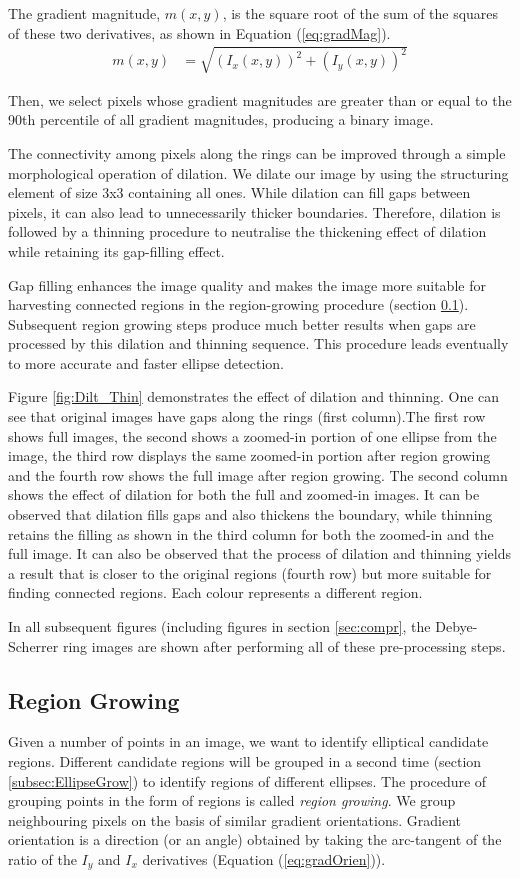 \documentclass[preprint]{iucr}              %
\newcommand\dsr{Debye-Scherrer ring}
\begin{document}
The gradient magnitude, $m(x,y)$, is the square root of the sum of the squares of these two derivatives, as shown in Equation (\ref{eq:gradMag}). 
\begin{align} \label{eq:gradMag}
m(x,y)&=\sqrt{(I_{x}(x,y))^2+(I_{y}(x,y))^2}
\end{align}

Then, we select pixels whose gradient magnitudes are greater than or equal to the 90th percentile of all gradient magnitudes, producing a binary image.

The connectivity among pixels along the rings can be improved through a simple morphological operation of dilation.  We dilate our image by using the structuring element of size 3x3 containing all ones. While dilation can fill gaps between pixels, it can also lead to unnecessarily thicker boundaries. Therefore, dilation is followed by a thinning procedure to neutralise the thickening effect of dilation while retaining its gap-filling effect.

Gap filling enhances the image quality and makes the image more suitable for harvesting connected regions in the region-growing procedure (section \ref{regGrow}). Subsequent region growing steps produce much better results when gaps are processed by this dilation and thinning sequence. This procedure leads eventually to more accurate and faster ellipse detection. 

Figure \ref{fig:Dilt_Thin} demonstrates the effect of dilation and thinning. One can see that original images have gaps along the rings (first column).The first row shows full images, the second shows a zoomed-in portion of one ellipse from the image, the third row displays the same zoomed-in portion after region growing and the fourth row shows the full image after region growing. The second column shows the effect of dilation for both the full and zoomed-in images. It can be observed that dilation fills gaps and also thickens the boundary, while thinning retains the filling as shown in the third column for both the zoomed-in and the full image. It can also be observed that the process of dilation and thinning yields a result that is closer to the original regions (fourth row) but more suitable for finding connected regions. Each colour represents a different region.

In all subsequent figures (including figures in section \ref{sec:compr}, the {\dsr} images are shown after performing all of these pre-processing steps.

\subsection{Region Growing} \label{regGrow}
Given a number of points in an image, we want to identify elliptical candidate regions. Different candidate regions will be grouped in a second time (section \ref{subsec:EllipseGrow}) to identify regions of different ellipses. The procedure of grouping points in the form of regions is called \textit{region growing}. We group neighbouring pixels on the basis of similar gradient orientations. Gradient orientation is a direction (or an angle) obtained by taking the arc-tangent of the ratio of the $I_y$ and $I_x$ derivatives (Equation (\ref{eq:gradOrien})).
\end{document}
